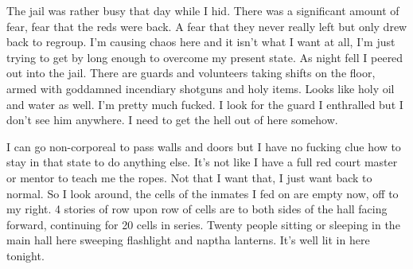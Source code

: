 The jail was rather busy that day while I hid. There was a significant amount of fear, fear that the reds were back. A fear that they never really left but only drew back to regroup. I'm causing chaos here and it isn't what I want at all, I'm just trying to get by long enough to overcome my present state. As night fell I peered out into the jail. There are guards and volunteers taking shifts on the floor, armed with goddamned incendiary shotguns and holy items. Looks like holy oil and water as well. I'm pretty much fucked. I look for the guard I enthralled but I don't see him anywhere. I need to get the hell out of here somehow.

I can go non-corporeal to pass walls and doors but I have no fucking clue how to stay in that state to do anything else. It's not like I have a full red court master or mentor to teach me the ropes. Not that I want that, I just want back to normal. So I look around, the cells of the inmates I fed on are empty now, off to my right. 4 stories of row upon row of cells are to both sides of the hall facing forward, continuing for 20 cells in series. Twenty people sitting or sleeping in the main hall here sweeping flashlight and naptha lanterns. It's well lit in here tonight.



